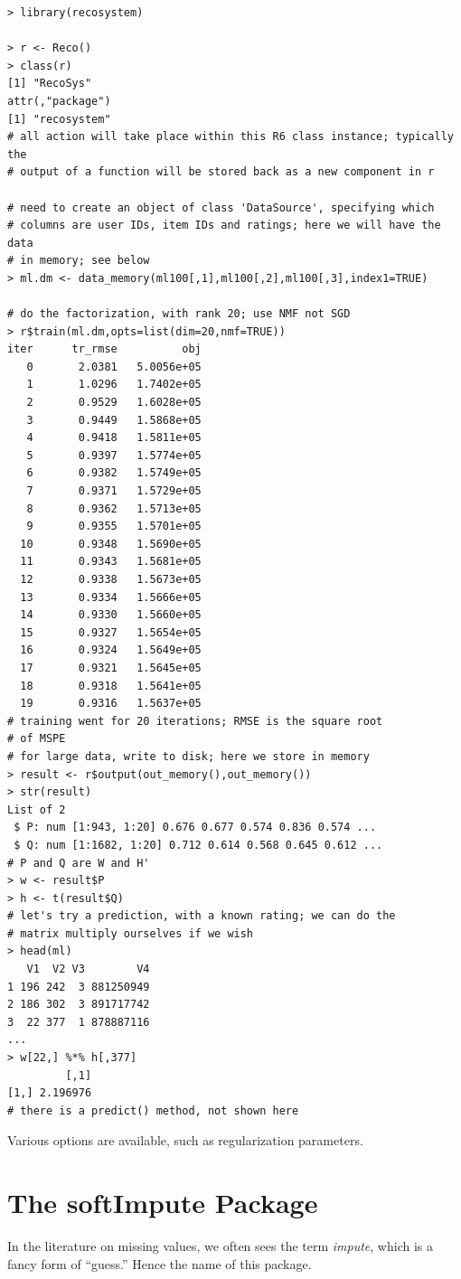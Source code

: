 \begin{lstlisting}
> library(recosystem)

> r <- Reco()
> class(r)
[1] "RecoSys"
attr(,"package")
[1] "recosystem"
# all action will take place within this R6 class instance; typically the 
# output of a function will be stored back as a new component in r

# need to create an object of class 'DataSource', specifying which
# columns are user IDs, item IDs and ratings; here we will have the data
# in memory; see below
> ml.dm <- data_memory(ml100[,1],ml100[,2],ml100[,3],index1=TRUE)

# do the factorization, with rank 20; use NMF not SGD
> r$train(ml.dm,opts=list(dim=20,nmf=TRUE))
iter      tr_rmse          obj
   0       2.0381   5.0056e+05
   1       1.0296   1.7402e+05
   2       0.9529   1.6028e+05
   3       0.9449   1.5868e+05
   4       0.9418   1.5811e+05
   5       0.9397   1.5774e+05
   6       0.9382   1.5749e+05
   7       0.9371   1.5729e+05
   8       0.9362   1.5713e+05
   9       0.9355   1.5701e+05
  10       0.9348   1.5690e+05
  11       0.9343   1.5681e+05
  12       0.9338   1.5673e+05
  13       0.9334   1.5666e+05
  14       0.9330   1.5660e+05
  15       0.9327   1.5654e+05
  16       0.9324   1.5649e+05
  17       0.9321   1.5645e+05
  18       0.9318   1.5641e+05
  19       0.9316   1.5637e+05
# training went for 20 iterations; RMSE is the square root
# of MSPE
# for large data, write to disk; here we store in memory
> result <- r$output(out_memory(),out_memory())
> str(result)
List of 2
 $ P: num [1:943, 1:20] 0.676 0.677 0.574 0.836 0.574 ...
 $ Q: num [1:1682, 1:20] 0.712 0.614 0.568 0.645 0.612 ...
# P and Q are W and H'
> w <- result$P
> h <- t(result$Q)
# let's try a prediction, with a known rating; we can do the
# matrix multiply ourselves if we wish
> head(ml)
   V1  V2 V3        V4
1 196 242  3 881250949
2 186 302  3 891717742
3  22 377  1 878887116
...
> w[22,] %*% h[,377]
         [,1]
[1,] 2.196976
# there is a predict() method, not shown here
\end{lstlisting}

Various options are available, such as regularization parameters.

\section{The softImpute Package}

In the literature on missing values, we often sees the term
\textit{impute}, which is a fancy form of ``guess.''  Hence the name of
this package.

